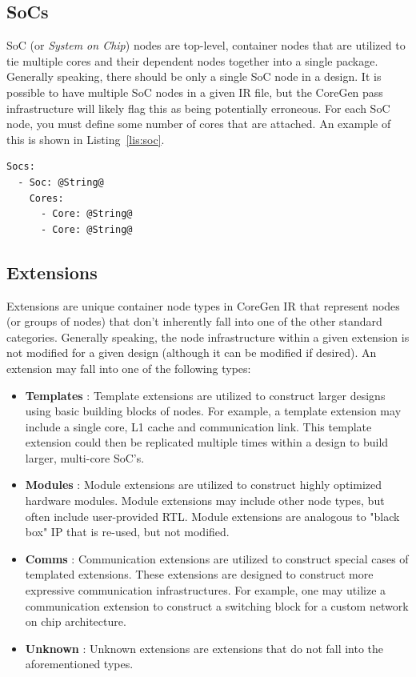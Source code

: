 \documentclass{article}
\begin{document}
\clearpage
\subsection{SoCs}
\label{sec:SoCNodes}

SoC (or \textit{System on Chip}) nodes are top-level, container nodes that are utilized to tie multiple cores and their dependent 
nodes together into a single package.  Generally speaking, there should be only a single SoC node in a design.  It is possible to 
have multiple SoC nodes in a given IR file, but the CoreGen pass infrastructure will likely flag this as being potentially erroneous.  
For each SoC node, you must define some number of cores that are attached.  An example of this is shown in Listing~\ref{lis:soc}.  

\vspace{0.125in}
\begin{lstlisting}[frame=single,style=base,caption={SoC Node Definition},captionpos=b,label={lis:soc}]
Socs:
  - Soc: @String@
    Cores:
      - Core: @String@
      - Core: @String@
\end{lstlisting}


\clearpage
\subsection{Extensions}
\label{sec:ExtensionNodes}

Extensions are unique container node types in CoreGen IR that represent nodes (or groups of nodes) that don't inherently 
fall into one of the other standard categories.  Generally speaking, the node infrastructure within a given extension 
is not modified for a given design (although it can be modified if desired).  An extension may fall into one of the following types: 

\begin{itemize}
\item \textbf{Templates} : Template extensions are utilized to construct larger designs using basic building blocks of 
nodes.  For example, a template extension may include a single core, L1 cache and communication link.  This template 
extension could then be replicated multiple times within a design to build larger, multi-core SoC's.
 
\item \textbf{Modules} : Module extensions are utilized to construct highly optimized hardware modules.  Module extensions 
may include other node types, but often include user-provided RTL.  Module extensions are analogous to "black box" IP 
that is re-used, but not modified.    

\item \textbf{Comms} : Communication extensions are utilized to construct special cases of templated extensions.  These 
extensions are designed to construct more expressive communication infrastructures.  For example, one may utilize a 
communication extension to construct a switching block for a custom network on chip architecture.  

\item \textbf{Unknown} : Unknown extensions are extensions that do not fall into the aforementioned types.  
\end{itemize}
\end{document}
